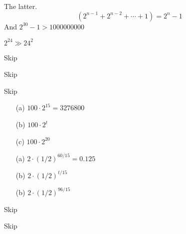 \documentclass{article}
\begin{document}
\begin{Answer}
    The latter.
    \[(2^{n-1} + 2^{n-2} + \cdots + 1) = 2^n - 1\]
    And $2^{30} - 1 > 1000000000$
\end{Answer}

\begin{Answer}
    $2^{24} \gg 24^2$
\end{Answer}

\begin{Answer} Skip \end{Answer}
\begin{Answer} Skip \end{Answer}
\begin{Answer} Skip \end{Answer}

\begin{Answer}
    \begin{itemize}
        \item[(a)]
            $100 \cdot 2^{15} = 3276800$
        \item[(b)]
            $100 \cdot 2^t$
        \item[(c)]
            $100 \cdot 2^{20}$
    \end{itemize}
\end{Answer}

\begin{Answer}
    \begin{itemize}
        \item[(a)]
            $2 \cdot (1/2)^{60/15} = 0.125$
        \item[(b)]
            $2 \cdot (1/2)^{t/15}$
        \item[(b)]
            $2 \cdot (1/2)^{96/15}$
    \end{itemize}
\end{Answer}

\begin{Answer} Skip \end{Answer}
\begin{Answer} Skip \end{Answer}
\end{document}
